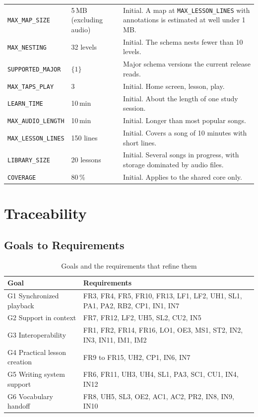 \documentclass[12pt]{article}
\newcommand{\cn}[1]{\texttt{#1}}
\begin{document}
{\begin{longtable}{@{}P{0.34\textwidth}P{0.15\textwidth}P{0.45\textwidth}@{}}
\cn{MAX\_MAP\_SIZE} & 5\,MB (excluding audio) & Initial. A map at
\cn{MAX\_LESSON\_LINES} with annotations is estimated at well under 1\,MB.\\
\cn{MAX\_NESTING} & 32 levels & Initial. The schema nests fewer than 10
levels.\\
\cn{SUPPORTED\_MAJOR} & $\{1\}$ & Major schema versions the current release
reads.\\
\cn{MAX\_TAPS\_PLAY} & 3 & Initial. Home screen, lesson, play.\\
\cn{LEARN\_TIME} & 10\,min & Initial. About the length of one study session.\\
\cn{MAX\_AUDIO\_LENGTH} & 10\,min & Initial. Longer than most popular songs.\\
\cn{MAX\_LESSON\_LINES} & 150 lines & Initial. Covers a song of 10 minutes with
short lines.\\
\cn{LIBRARY\_SIZE} & 20 lessons & Initial. Several songs in progress, with
storage dominated by audio files.\\
\cn{COVERAGE} & 80\,\% & Initial. Applies to the shared core only.\\
\bottomrule
\end{longtable}
}

\section{Traceability} \label{SecTrace}

\subsection{Goals to Requirements}
\begin{table}[H]
\caption{Goals and the requirements that refine them} \label{TblGoalTrace}
\begin{tabularx}{\textwidth}{lX}
\toprule
\textbf{Goal} & \textbf{Requirements}\\
\midrule
G1 Synchronized playback & FR3, FR4, FR5, FR10, FR13, LF1, LF2, UH1, SL1,
PA1, PA2, RB2, CP1, IN1, IN7\\
G2 Support in context & FR7, FR12, LF2, UH5, SL2, CU2, IN5\\
G3 Interoperability & FR1, FR2, FR14, FR16, LO1, OE3, MS1, ST2, IN2, IN3,
IN11, IM1, IM2\\
G4 Practical lesson creation & FR9 to FR15, UH2, CP1, IN6, IN7\\
G5 Writing system support & FR6, FR11, UH3, UH4, SL1, PA3, SC1, CU1, IN4,
IN12\\
G6 Vocabulary handoff & FR8, UH5, SL3, OE2, AC1, AC2, PR2, IN8, IN9, IN10\\
\bottomrule
\end{tabularx}
\end{table}
\end{document}
